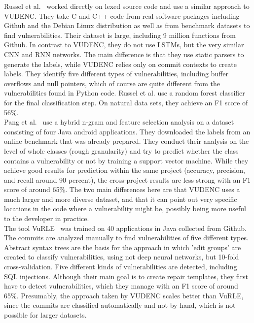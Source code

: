 \documentclass[
a4paper,
pagesize,
pdftex,
12pt,
ngerman,
fleqn,
final,
]{scrartcl}
\begin{document}
	Russel et al.~\cite{Russell.2018} worked directly on lexed source code and use a similar approach to VUDENC. They take C and C++ code from real software packages including Github and the Debian Linux distribution as well as from benchmark datasets to find vulnerabilities. Their dataset is large, including 9 million functions from Github. In contrast to VUDENC, they do not use LSTMs, but the very similar CNN and RNN networks. The main difference is that they use static parsers to generate the labels, while  VUDENC relies only on commit contexts to create labels. They identify five different types of vulnerabilities, including buffer overflows and null pointers, which of course are quite different from the vulnerabilities found in Python code. Russel et al. use a random forest classifier for the final classification step. On natural data sets, they achieve an F1 score of 56\%.\\
	Pang et al.~\cite{Pang.2015} use a hybrid n-gram and feature selection analysis on a dataset consisting of four Java android applications. They downloaded the labels from an online benchmark that was already prepared. They conduct their analysis on the level of whole classes (rough granularity) and try to predict whether the class contains a vulnerability or not by training a support vector machine. While they achieve good results for prediction within the same project (accuracy, precision, and recall around 90 percent), the cross-project results are less strong with an F1 score of around 65\%. The two main differences here are that VUDENC uses a much larger and more diverse dataset, and that it can point out very specific locations in the code where a vulnerability might be, possibly being more useful to the developer in practice.\\
	The tool VuRLE~\cite{Ma.2017} was trained on 40 applications in Java collected from Github. The commits are analyzed manually to find vulnerabilities of five different types. Abstract syntax trees are the basis for the approach in which 'edit groups' are created to classify vulnerabilities, using not deep neural networks, but 10-fold cross-validation. Five different kinds of vulnerabilities are detected, including SQL injections. Although their main goal is to create repair templates, they first have to detect vulnerabilities, which they manage with an F1 score of around 65\%. Presumably, the approach taken by VUDENC scales better than VuRLE, since the commits are classified automatically and not by hand, which is not possible for larger datasets.\\ 
\end{document}
